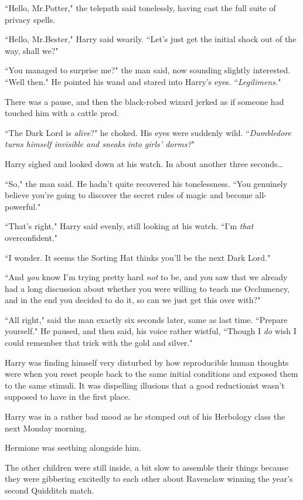 ``Hello, Mr.\?Potter," the telepath said tonelessly, having cast the full suite of privacy spells.

``Hello, Mr.\?Bester," Harry said wearily. ``Let's just get the initial shock out of the way, shall we?"

``You managed to surprise me?" the man said, now sounding slightly interested. ``Well then." He pointed his wand and stared into Harry's eyes. ``\emph{Legilimens.}"

There was a pause, and then the black-robed wizard jerked as if someone had touched him with a cattle prod.

``The Dark Lord is \emph{alive}?" he choked. His eyes were suddenly wild. ``\emph{Dumbledore turns himself invisible and sneaks into girls' dorms?}"

Harry sighed and looked down at his watch. In about another three seconds{\ldots}

``So," the man said. He hadn't quite recovered his tonelessness. ``You genuinely believe you're going to discover the secret rules of magic and become all-powerful."

``That's right," Harry said evenly, still looking at his watch. ``I'm \emph{that} overconfident."

``I wonder. It seems the Sorting Hat thinks you'll be the next Dark Lord."

``And \emph{you} know I'm trying pretty hard \emph{not} to be, and you saw that we already had a long discussion about whether you were willing to teach me Occlumency, and in the end you decided to do it, so can we just get this over with?"

``All right," said the man exactly six seconds later, same as last time. ``Prepare yourself." He paused, and then said, his voice rather wistful, ``Though I \emph{do} wish I could remember that trick with the gold and silver."

Harry was finding himself very disturbed by how reproducible human thoughts were when you reset people back to the same initial conditions and exposed them to the same stimuli. It was dispelling illusions that a good reductionist wasn't supposed to have in the first place.

\later

Harry was in a rather bad mood as he stomped out of his Herbology class the next Monday morning.

Hermione was seething alongside him.

The other children were still inside, a bit slow to assemble their things because they were gibbering excitedly to each other about Ravenclaw winning the year's second Quidditch match.

